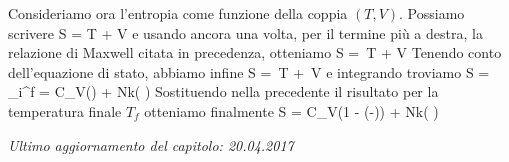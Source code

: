 Consideriamo ora l'entropia come funzione della coppia $(T,V)$. Possiamo scrivere
\be
\de S = \de T + \de V
\ee
e usando ancora una volta, per il termine più a destra, la relazione di Maxwell citata in precedenza, otteniamo
\be
\de S = \,\de T + \de V
\ee
Tenendo conto dell'equazione di stato, abbiamo infine
\be
\de S = \,\de T + \,\de V
\ee
e integrando troviamo
\be
\Delta S = \int_i^f = C_V\ln\left(\right) + 
Nk\ln\left( \right)
\ee
Sostituendo nella precedente il risultato per la temperatura finale $T_f$ otteniamo finalmente
\be
\Delta S = C_V\ln\left(1 - \left(-\right)\right)
+ Nk\ln\left( \right)
\ee


\vskip 0.75cm
\begin{flushright}
{\em Ultimo aggiornamento del capitolo: 20.04.2017}
\end{flushright}